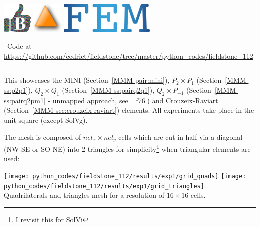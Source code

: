 \includegraphics[height=1.5cm]{images/pictograms/benchmark}
\includegraphics[height=1.5cm]{images/pictograms/triangle}
\includegraphics[height=1.5cm]{images/pictograms/FEM}



\begin{center}
\inpython~Code at \url{https://github.com/cedrict/fieldstone/tree/master/python_codes/fieldstone_112}
\end{center}

\par\noindent\rule{\textwidth}{0.4pt}



This \stone showcases the MINI (Section~\ref{MMM-pair:mini}), 
$P_2\times P_1$ (Section~\ref{MMM-ss:p2p1}), $Q_2\times Q_1$ (Section~\ref{MMM-ss:pairq2q1}), 
$Q_2\times P_{-1}$ (Section~\ref{MMM-ss:pairq2pm1} - unmapped approach, see \stone~\ref{f76}) 
and Crouzeix-Raviart  (Section~\ref{MMM-sec:crouzeix-raviart}) elements.
All experiments take place in the unit square (except SolVg). 

The mesh is composed of $nel_x \times nel_y$ cells which are cut in half via a  
diagonal (NW-SE or SO-NE) into 2 triangles for simplicity\footnote{I revisit this for SolVi} 
when triangular elements are used: 

\begin{center}
\texttt{[image: python\_codes/fieldstone\_112/results/exp1/grid\_quads]}
\texttt{[image: python\_codes/fieldstone\_112/results/exp1/grid\_triangles]}\\
{\captionfont Quadrilaterals and triangles mesh for a resolution of $16\times 16$ cells.} 
\end{center}

